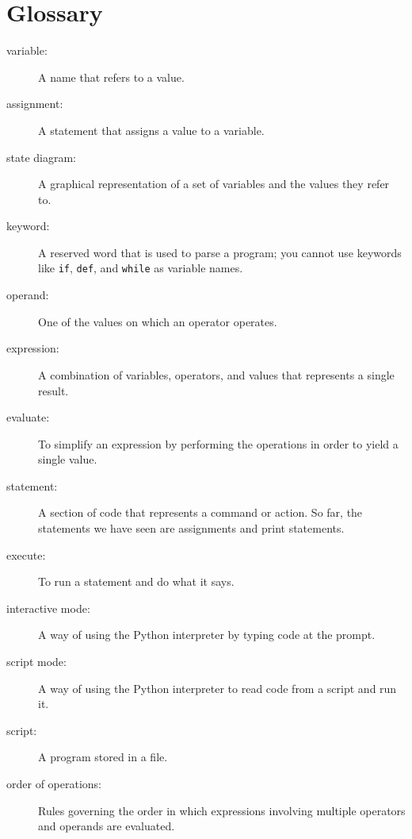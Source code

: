 \documentclass[10pt]{book}
\begin{document}
\section{Glossary}

\begin{description}

\item[variable:]  A name that refers to a value.

\item[assignment:]  A statement that assigns a value to a variable.

\item[state diagram:]  A graphical representation of a set of variables and the
values they refer to.

\item[keyword:]  A reserved word that is used to parse a
program; you cannot use keywords like {\tt if}, {\tt  def}, and {\tt while} as
variable names.

\item[operand:]  One of the values on which an operator operates.

\item[expression:]  A combination of variables, operators, and values that
represents a single result.

\item[evaluate:]  To simplify an expression by performing the operations
in order to yield a single value.

\item[statement:]  A section of code that represents a command or action.  So
far, the statements we have seen are assignments and print statements.

\item[execute:]  To run a statement and do what it says.

\item[interactive mode:] A way of using the Python interpreter by
typing code at the prompt.

\item[script mode:] A way of using the Python interpreter to read
code from a script and run it.

\item[script:] A program stored in a file.

\item[order of operations:]  Rules governing the order in which
expressions involving multiple operators and operands are evaluated.


\end{description}
\end{document}
